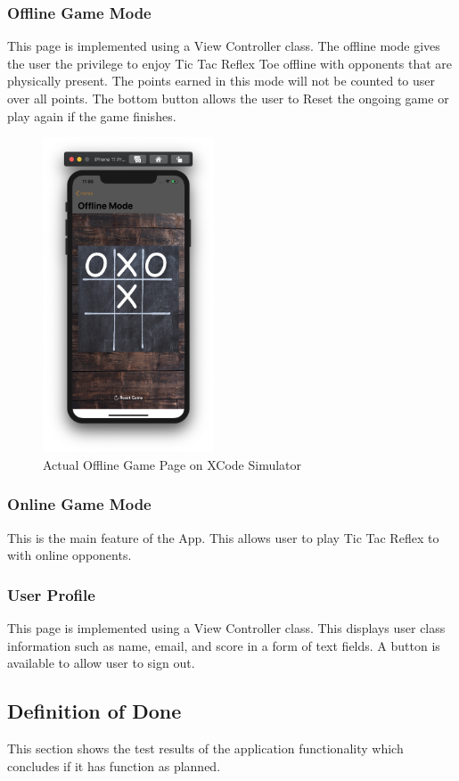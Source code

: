 \documentclass{article}
\begin{document}
    \subsubsection{Offline Game Mode}
    This page is implemented using a View Controller class.  The offline mode gives the user the privilege to enjoy Tic Tac Reflex Toe offline with opponents that are physically present.  The points earned in this mode will not be counted to user over all points.  The bottom button allows the user to Reset the ongoing game or play again if the game finishes.
        \begin{figure}[h]
            \centering
            \includegraphics[width=2in]{images/board.png}
        \caption{Actual Offline Game Page on XCode Simulator}
        \end{figure}  
        \newpage
    \subsubsection{Online Game Mode}
    This is the main feature of the App.  This allows user to play Tic Tac Reflex to with  online opponents.
    \subsubsection{User Profile}
    This page is implemented using a View Controller class.  This displays user class information such as name, email, and score in a form of text fields.  A button is available to allow user to sign out.
    
\newpage
\subsection{Definition of Done} This section shows the test results of the application functionality which concludes if it has function as planned.
\end{document}
